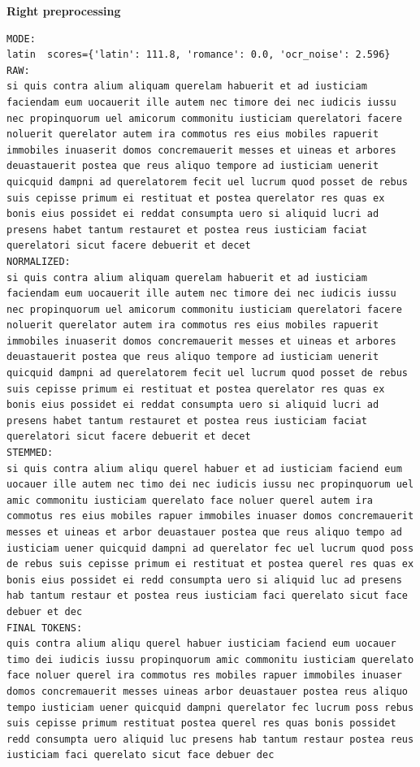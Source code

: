 \textbf{Right preprocessing} 

\begin{lstlisting}[breaklines=true,basicstyle=\ttfamily\small]
MODE:
latin  scores={'latin': 111.8, 'romance': 0.0, 'ocr_noise': 2.596}
RAW:
si quis contra alium aliquam querelam habuerit et ad iusticiam faciendam eum uocauerit ille autem nec timore dei nec iudicis iussu nec propinquorum uel amicorum commonitu iusticiam querelatori facere noluerit querelator autem ira commotus res eius mobiles rapuerit immobiles inuaserit domos concremauerit messes et uineas et arbores deuastauerit postea que reus aliquo tempore ad iusticiam uenerit quicquid dampni ad querelatorem fecit uel lucrum quod posset de rebus suis cepisse primum ei restituat et postea querelator res quas ex bonis eius possidet ei reddat consumpta uero si aliquid lucri ad presens habet tantum restauret et postea reus iusticiam faciat querelatori sicut facere debuerit et decet
NORMALIZED:
si quis contra alium aliquam querelam habuerit et ad iusticiam faciendam eum uocauerit ille autem nec timore dei nec iudicis iussu nec propinquorum uel amicorum commonitu iusticiam querelatori facere noluerit querelator autem ira commotus res eius mobiles rapuerit immobiles inuaserit domos concremauerit messes et uineas et arbores deuastauerit postea que reus aliquo tempore ad iusticiam uenerit quicquid dampni ad querelatorem fecit uel lucrum quod posset de rebus suis cepisse primum ei restituat et postea querelator res quas ex bonis eius possidet ei reddat consumpta uero si aliquid lucri ad presens habet tantum restauret et postea reus iusticiam faciat querelatori sicut facere debuerit et decet
STEMMED:
si quis contra alium aliqu querel habuer et ad iusticiam faciend eum uocauer ille autem nec timo dei nec iudicis iussu nec propinquorum uel amic commonitu iusticiam querelato face noluer querel autem ira commotus res eius mobiles rapuer immobiles inuaser domos concremauerit messes et uineas et arbor deuastauer postea que reus aliquo tempo ad iusticiam uener quicquid dampni ad querelator fec uel lucrum quod poss de rebus suis cepisse primum ei restituat et postea querel res quas ex bonis eius possidet ei redd consumpta uero si aliquid luc ad presens hab tantum restaur et postea reus iusticiam faci querelato sicut face debuer et dec
FINAL TOKENS:
quis contra alium aliqu querel habuer iusticiam faciend eum uocauer timo dei iudicis iussu propinquorum amic commonitu iusticiam querelato face noluer querel ira commotus res mobiles rapuer immobiles inuaser domos concremauerit messes uineas arbor deuastauer postea reus aliquo tempo iusticiam uener quicquid dampni querelator fec lucrum poss rebus suis cepisse primum restituat postea querel res quas bonis possidet redd consumpta uero aliquid luc presens hab tantum restaur postea reus iusticiam faci querelato sicut face debuer dec

\end{lstlisting}
